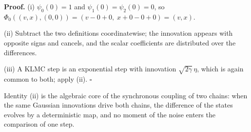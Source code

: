 \documentclass[11pt,a4paper]{article}
\begin{document}
\textbf{Proof.} (i) \(\psi_0(0)=1\) and \(\psi_1(0)=\psi_2(0)=0\), so \(\Phi_0((v,x),(0,0))=(v-0+0,\;x+0-0+0)=(v,x)\).




(ii) Subtract the two definitions coordinatewise; the innovation appears with opposite signs and cancels, and the scalar coefficients are distributed over the differences.




(iii) A KLMC step is an exponential step with innovation \(\sqrt{2\gamma}\,\eta\), which is again common to both; apply (ii). \(\square\)




Identity (ii) is the algebraic core of the synchronous coupling of two chains: when the same Gaussian innovations drive both chains, the difference of the states evolves by a deterministic map, and no moment of the noise enters the comparison of one step.
\end{document}
